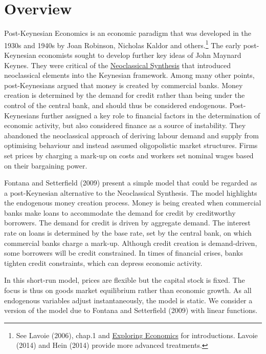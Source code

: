 \documentclass[
  letterpaper,
  DIV=11,
  numbers=noendperiod]{scrreprt}
\begin{document}
\section{Overview}\label{overview-3}

Post-Keynesian Economics is an economic paradigm that was developed in
the 1930s and 1940s by Joan Robinson, Nicholas Kaldor and
others.\footnote{See Lavoie (2006), chap.1 and
  \href{https://www.exploring-economics.org/en/orientation/post-keynesian-economics/}{Exploring
  Economics} for introductions. Lavoie (2014) and Hein (2014) provide
  more advanced treatments.} The early post-Keynesian economists sought
to develop further key ideas of John Maynard Keynes. They were critical
of the \href{@neoclassical_synth_chapter}{Neoclassical Synthesis} that
introduced neoclassical elements into the Keynesian framework. Among
many other points, post-Keynesians argued that money is created by
commercial banks. Money creation is determined by the demand for credit
rather than being under the control of the central bank, and should thus
be considered endogenous. Post-Keynesians further assigned a key role to
financial factors in the determination of economic activity, but also
considered finance as a source of instability. They abandoned the
neoclassical approach of deriving labour demand and supply from
optimising behaviour and instead assumed oligopolistic market
structures. Firms set prices by charging a mark-up on costs and workers
set nominal wages based on their bargaining power.

Fontana and Setterfield (2009) present a simple model that could be
regarded as a post-Keynesian alternative to the Neoclassical Synthesis.
The model highlights the endogenous money creation process. Money is
being created when commercial banks make loans to accommodate the demand
for credit by creditworthy borrowers. The demand for credit is driven by
aggregate demand. The interest rate on loans is determined by the base
rate, set by the central bank, on which commercial banks charge a
mark-up. Although credit creation is demand-driven, some borrowers will
be credit constrained. In times of financial crises, banks tighten
credit constraints, which can depress economic activity.

In this short-run model, prices are flexible but the capital stock is
fixed. The focus is thus on goods market equilibrium rather than
economic growth. As all endogenous variables adjust instantaneously, the
model is static. We consider a version of the model due to Fontana and
Setterfield (2009) with linear functions.
\end{document}
